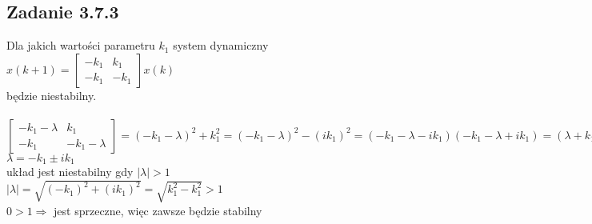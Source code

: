 \pagebreak
\subsection*{Zadanie 3.7.3} {\color{darkgray}
	Dla jakich wartości parametru $k_1$ system dynamiczny\\
	$x(k+1)=\left[ \begin{array}{cc}    -k_1 &k_1 \\ -k_1 &-k_1    \end{array}\right]x(k)$\\
	będzie niestabilny.
}\\\\
$\left[ \begin{array}{cc}    -k_1 -\lambda&k_1 \\ -k_1 &-k_1-\lambda    \end{array}\right]
=(-k_1-\lambda)^2+k_1^2=(-k_1-\lambda)^2-(ik_1)^2=(-k_1-\lambda-ik_1)(-k_1-\lambda+ik_1)=(\lambda+k_1-ik_1)(\lambda+k_1+ik_1)=0$\\
$\lambda=-k_1 \pm ik_1$\\
układ jest niestabilny gdy $|\lambda|>1$\\
$|\lambda|=\sqrt{(-k_1)^2+(ik_1)^2}=\sqrt{k_1^2-k_1^2}>1$\\
$0>1 \Rightarrow$ jest sprzeczne, więc zawsze będzie stabilny \\














\pagebreak
